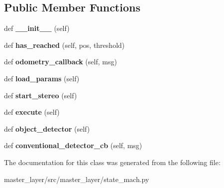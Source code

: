 \subsection*{Public Member Functions}
\begin{DoxyCompactItemize}
\item 
\mbox{\label{classmaster__layer_1_1state__mach_1_1TaskBaseClass_adf76dbc8ea4eeaaae9d328df1912a109}} 
def {\bfseries \+\_\+\+\_\+init\+\_\+\+\_\+} (self)
\item 
\mbox{\label{classmaster__layer_1_1state__mach_1_1TaskBaseClass_ad9c4abb2ecde674a0c349703a21ac789}} 
def {\bfseries has\+\_\+reached} (self, pos, threshold)
\item 
\mbox{\label{classmaster__layer_1_1state__mach_1_1TaskBaseClass_af00a6714bc08e5ac1b38f864cde01a22}} 
def {\bfseries odometry\+\_\+callback} (self, msg)
\item 
\mbox{\label{classmaster__layer_1_1state__mach_1_1TaskBaseClass_abba594382727321def97f61dd16a0e3f}} 
def {\bfseries load\+\_\+params} (self)
\item 
\mbox{\label{classmaster__layer_1_1state__mach_1_1TaskBaseClass_a62a458e25f60fd4500859e5ba3310075}} 
def {\bfseries start\+\_\+stereo} (self)
\item 
\mbox{\label{classmaster__layer_1_1state__mach_1_1TaskBaseClass_aa10878f9ba2b9cb664138d22c0476e87}} 
def {\bfseries execute} (self)
\item 
\mbox{\label{classmaster__layer_1_1state__mach_1_1TaskBaseClass_af989538d4a8c283f563237d3a0af018e}} 
def {\bfseries object\+\_\+detector} (self)
\item 
\mbox{\label{classmaster__layer_1_1state__mach_1_1TaskBaseClass_a5ff233b9190427dd2b337319bdc9ef9c}} 
def {\bfseries conventional\+\_\+detector\+\_\+cb} (self, msg)
\end{DoxyCompactItemize}


The documentation for this class was generated from the following file\+:\begin{DoxyCompactItemize}
\item 
master\+\_\+layer/src/master\+\_\+layer/state\+\_\+mach.\+py\end{DoxyCompactItemize}

